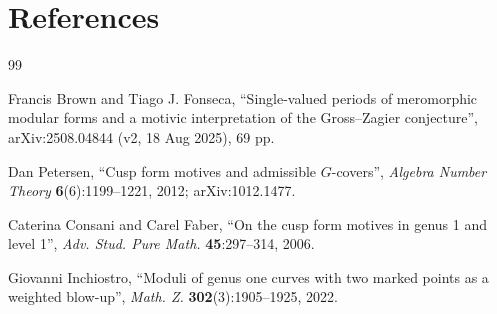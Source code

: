 \documentclass[11pt]{article}
\theoremstyle{definition}
\begin{document}
\section*{References}

\begin{thebibliography}{99}

 Francis Brown and Tiago J. Fonseca,
``Single-valued periods of meromorphic modular forms and a motivic interpretation
of the Gross--Zagier conjecture'', arXiv:2508.04844 (v2, 18 Aug 2025), 69 pp.

 Dan Petersen, ``Cusp form motives and admissible $G$-covers'',
\emph{Algebra Number Theory} \textbf{6}(6):1199--1221, 2012; arXiv:1012.1477.

 Caterina Consani and Carel Faber, ``On the cusp form motives in
genus 1 and level 1'', \emph{Adv. Stud. Pure Math.} \textbf{45}:297--314, 2006.

 Giovanni Inchiostro, ``Moduli of genus one curves with two marked
points as a weighted blow-up'', \emph{Math. Z.} \textbf{302}(3):1905--1925, 2022.

\end{thebibliography}
\end{document}
